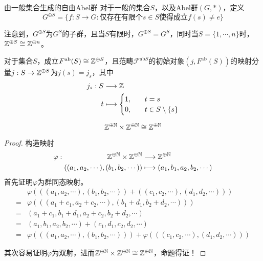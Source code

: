 \begin{theorem}{由一般集合生成的自由Abel群}
	对于一般的集合$S$，以及Abel群$(G,*)$，定义
	$$
	G^{\oplus S}=\{ f:S\to G:\text{仅存在有限个} s\in S \text{使得成立} f(s)\ne e  \}
	$$
	
	注意到，$G^{\oplus S}$为$G^S$的子群，且当$S$有限时，$G^{\oplus S}=G^S$，同时当$S=\{1,\cdots,n\}$时，$\mathbb{Z}^{\oplus S}\cong\mathbb{Z}^{\oplus n}$。
	
	对于集合$S$，成立$F^{\mathrm{ab}}(S)\cong \mathbb{Z}^{\oplus S}$，且范畴$\mathscr{F}^{\mathrm{ab}S}$的初始对象$(j,F^{\mathrm{ab}}(S))$的映射分量$j:S\to \mathbb{Z}^{\oplus S}$为$j(s)=j_s$，其中
	\begin{align*}
		j_s:\begin{aligned}[t]
			S&\longrightarrow\mathbb{Z}\\
			t&\longmapsto\begin{cases}
				1,\quad & t=s\\
				0,\quad & t\in S\setminus\{s\}
			\end{cases}
		\end{aligned}
	\end{align*}
\end{theorem}

\begin{proposition}
	$$
	\mathbb{Z}^{\oplus \mathbb{N}}\times \mathbb{Z}^{\oplus \mathbb{N}}\cong \mathbb{Z}^{\oplus \mathbb{N}}
	$$
\end{proposition}

\begin{proof}
	构造映射
	\begin{align*}
		\varphi:\begin{aligned}[t]
			\mathbb{Z}^{\oplus \mathbb{N}}\times \mathbb{Z}^{\oplus \mathbb{N}}&\longrightarrow \mathbb{Z}^{\oplus \mathbb{N}}\\
			((a_1,a_2,\cdots),(b_1,b_2,\cdots))&\longmapsto (a_1,b_1,a_2,b_2,\cdots)
		\end{aligned}
	\end{align*}
	首先证明$\varphi$为群同态映射。
	\begin{align*}
		&\varphi(((a_1,a_2,\cdots),(b_1,b_2,\cdots))+((c_1,c_2,\cdots),(d_1,d_2,\cdots)))\\
		=&\varphi(((a_1+c_1,a_2+c_2,\cdots),(b_1+d_1,b_2+d_2,\cdots)))\\
		=&(a_1+c_1,b_1+d_1,a_2+c_2,b_2+d_2,\cdots)\\
		=&(a_1,b_1,a_2,b_2,\cdots)+(c_1,d_1,c_2,d_2,\cdots)\\
		=&\varphi(((a_1,a_2,\cdots),(b_1,b_2,\cdots)))+\varphi(((c_1,c_2,\cdots),(d_1,d_2,\cdots)))
	\end{align*}

	其次容易证明$\varphi$为双射，进而$\mathbb{Z}^{\oplus \mathbb{N}}\times \mathbb{Z}^{\oplus \mathbb{N}}\cong \mathbb{Z}^{\oplus \mathbb{N}}$，命题得证！
\end{proof}

